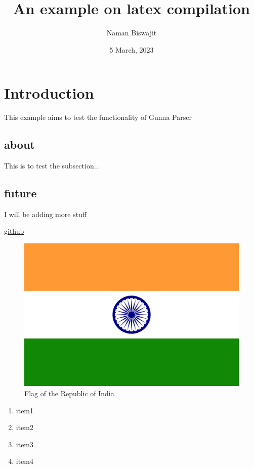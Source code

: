 \documentclass{article}
\title{An example on latex compilation}
\author{Naman Biswajit}
\date{5 March, 2023}
\begin{document}
\maketitle




\section{Introduction}
This example aims to test the functionality of Gunna Parser

\subsection{about}
This is to test the subsection...

\subsection{future}
I will be adding more stuff

\href{https://github.com/}{github}

\begin{figure}
\includegraphics[scale=2]{flag.png}
\caption{Flag of the Republic of India}
\centering

\end{figure}


\begin{enumerate}

\item  item1
\item  item2
\item  item3
\item  item4
\end{enumerate}
\end{document}
